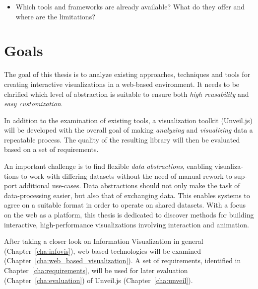 \begin{english}
\begin{itemize}
  \item Which tools and frameworks are already available? What do they offer and where are the limitations?
\end{itemize}

\section{Goals}

The goal of this thesis is to analyze existing approaches, techniques and tools for creating interactive visualizations in a web-based environment. It needs to be clarified which level of abstraction is suitable to ensure both \emph{high reusability} and \emph{easy customization}. 

In addition to the examination of existing tools, a visualization toolkit (Unveil.js) will be developed with the overall goal of making \emph{analyzing} and \emph{visualizing} data a repeatable process. The quality of the resulting library will then be evaluated based on a set of requirements.

An important challenge is to find flexible \emph{data abstractions}, enabling visualizations to work with differing datasets without the need of manual rework to support additional use-cases. Data abstractions should not only make the task of data-processing easier, but also that of exchanging data. This enables systems to agree on a suitable format in order to operate on shared datasets. With a focus on the web as a platform, this thesis is dedicated to discover methods for building interactive, high-performance visualizations involving interaction and animation. 

After taking a closer look on Information Visualization in general (Chapter~\ref{cha:infovis}), web-based technologies will be examined (Chapter~\ref{cha:web_based_visualization}). A set of requirements, identified in Chapter~\ref{cha:requirements}, will be used for later evaluation (Chapter~\ref{cha:evaluation}) of Unveil.js (Chapter~\ref{cha:unveil}).

\end{english}